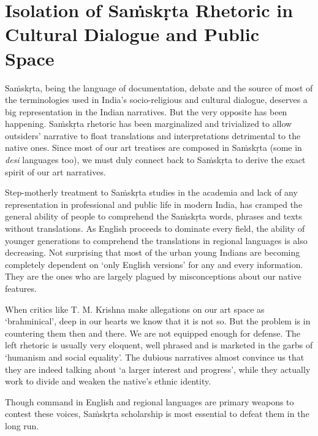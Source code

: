 \vspace{-.3cm}

\section*{Isolation of Saṁskṛta Rhetoric in Cultural Dialogue and Public Space}

Saṁskṛta, being the language of documentation, debate and the source of most of the terminologies used in India’s socio-religious and cultural dialogue, deserves a big representation in the Indian narratives. But the very opposite has been happening. Saṁskṛta rhetoric has been marginalized and trivialized to allow outsiders’ narrative to float translations and interpretations detrimental to the native ones. Since most of our art treatises are composed in Saṁskṛta (some in \textit{desi} languages too), we must duly connect back to Saṁskṛta to derive the exact spirit of our art narratives.

Step-motherly treatment to Saṁskṛta studies in the academia and lack of any representation in professional and public life in modern India, has cramped the general ability of people to comprehend the Saṁskṛta words, phrases and texts without translations. As English proceeds to dominate every field, the ability of younger generations to comprehend the translations in regional languages is also decreasing. Not surprising that most of the urban young Indians are becoming completely dependent on ‘only English versions’ for any and every information. They are the ones who are largely plagued by misconceptions about our native features.

When critics like T. M. Krishna make allegations on our art space as ‘brahminical’, deep in our hearts we know that it is not so. But the problem is in countering them then and there. We are not equipped enough for defense. The left rhetoric is usually very eloquent, well phrased and is marketed in the garbs of ‘humanism and social equality’. The dubious narratives almost convince us that they are indeed talking about ‘a larger interest and progress’, while they actually work to divide and weaken the native’s ethnic identity.

Though command in English and regional languages are primary weapons to contest these voices, Saṁskṛta scholarship is most essential to defeat them in the long run.


